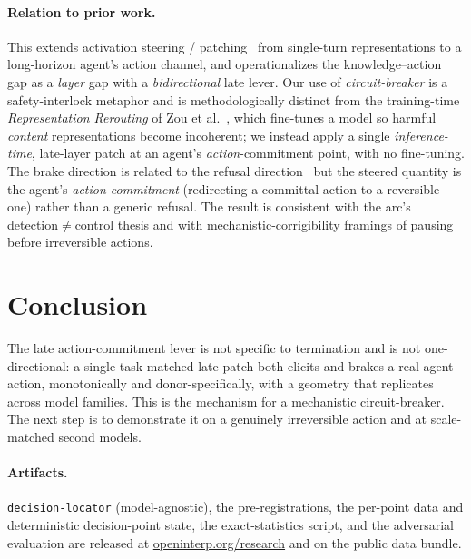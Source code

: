 \documentclass[11pt]{article}
\begin{document}
\paragraph{Relation to prior work.} This extends activation steering / patching~\cite{actadd,repe} from
single-turn representations to a long-horizon agent's action channel, and operationalizes the knowledge--action
gap as a \emph{layer} gap with a \emph{bidirectional} late lever. Our use of \emph{circuit-breaker} is a
safety-interlock metaphor and is methodologically distinct from the training-time \emph{Representation
Rerouting} of Zou et al.~\cite{circuitbreakers}, which fine-tunes a model so harmful \emph{content}
representations become incoherent; we instead apply a single \emph{inference-time}, late-layer patch at an
agent's \emph{action}-commitment point, with no fine-tuning. The brake direction is related to the refusal
direction~\cite{refusaldir} but the steered quantity is the agent's \emph{action commitment} (redirecting a
committal action to a reversible one) rather than a generic refusal. The result is consistent with the arc's
detection$\neq$control thesis and with mechanistic-corrigibility framings of pausing before irreversible
actions.

\section{Conclusion}
The late action-commitment lever is not specific to termination and is not one-directional: a single
task-matched late patch both elicits and brakes a real agent action, monotonically and donor-specifically, with
a geometry that replicates across model families. This is the mechanism for a mechanistic circuit-breaker. The
next step is to demonstrate it on a genuinely irreversible action and at scale-matched second models.

\paragraph{Artifacts.} \texttt{decision-locator} (model-agnostic), the pre-registrations, the per-point data
and deterministic decision-point state, the exact-statistics script, and the adversarial evaluation are
released at \href{https://openinterp.org/research}{openinterp.org/research} and on the public data bundle.
\end{document}
